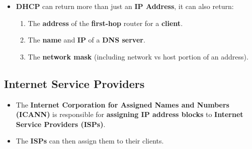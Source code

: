\documentclass{article}
\begin{document}
\begin{itemize}
        \item \textbf{DHCP} can return more than just an \textbf{IP Address}, it can also return:
        \begin{enumerate}
            \item The \textbf{address} of the \textbf{first-hop} router for a \textbf{client}.
            \item The \textbf{name} and \textbf{IP} of a \textbf{DNS server}.
            \item The \textbf{network mask} (including network vs host portion of an address).
        \end{enumerate}
    \end{itemize}

    \subsection*{Internet Service Providers}
    \begin{itemize}
        \item The \textbf{Internet Corporation for Assigned Names and Numbers (ICANN)} is responsible for \textbf{assigning IP address blocks} to \textbf{Internet Service Providers (ISPs)}.
        \item The \textbf{ISPs} can then assign them to their clients.
    \end{itemize}
\end{document}
